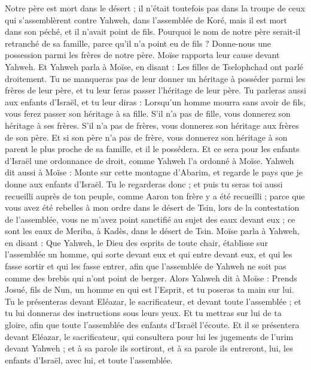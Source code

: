 \begin{multicols}{2}
Notre père est mort dans le désert ; il n'était toutefois pas dans la troupe de ceux qui s’assemblèrent contre Yahweh, dans l'assemblée de Koré, mais il est mort dans son péché, et il n'avait point de fils.
Pourquoi le nom de notre père serait-il retranché de sa famille, parce qu'il n'a point eu de fils ? Donne-nous une possession parmi les frères de notre père.
Moïse rapporta leur cause devant Yahweh.
Et Yahweh parla à Moïse, en disant :
Les filles de Tselophchad ont parlé droitement. Tu ne manqueras pas de leur donner un héritage à posséder parmi les frères de leur père, et tu leur feras passer l’héritage de leur père.
Tu parleras aussi aux enfants d'Israël, et tu leur diras : Lorsqu'un homme mourra sans avoir de fils, vous ferez passer son héritage à sa fille.
S'il n'a pas de fille, vous donnerez son héritage à ses frères.
S'il n'a pas de frères, vous donnerez son héritage aux frères de son père.
Et si son père n'a pas de frère, vous donnerez son héritage à son parent le plus proche de sa famille, et il le possédera. Et ce sera pour les enfants d'Israël une ordonnance de droit, comme Yahweh l'a ordonné à Moïse.
Yahweh dit aussi à Moïse : Monte sur cette montagne d'Abarim, et regarde le pays que je donne aux enfants d'Israël.
Tu le regarderas donc ; et puis tu seras toi aussi recueilli auprès de ton peuple, comme Aaron ton frère y a été recueilli ;
parce que vous avez été rebelles à mon ordre dans le désert de Tsin, lors de la contestation de l'assemblée, vous ne m'avez point sanctifié au sujet des eaux devant eux ; ce sont les eaux de Meriba, à Kadès, dans le désert de Tsin.
Moïse parla à Yahweh, en disant :
Que Yahweh, le Dieu des esprits de toute chair, établisse sur l'assemblée un homme,
qui sorte devant eux et qui entre devant eux, et qui les fasse sortir et qui les fasse entrer, afin que l'assemblée de Yahweh ne soit pas comme des brebis qui n'ont point de berger.
Alors Yahweh dit à Moïse : Prends Josué, fils de Nun, un homme en qui est l'Esprit, et tu poseras ta main sur lui.
Tu le présenteras devant Eléazar, le sacrificateur, et devant toute l'assemblée ; et tu lui donneras des instructions sous leurs yeux.
Et tu mettras sur lui de ta gloire, afin que toute l'assemblée des enfants d'Israël l'écoute.
Et il se présentera devant Eléazar, le sacrificateur, qui consultera pour lui les jugements de l'urim devant Yahweh ; et à sa parole ils sortiront, et à sa parole ils entreront, lui, les enfants d’Israël, avec lui, et toute l’assemblée.

\end{multicols}
